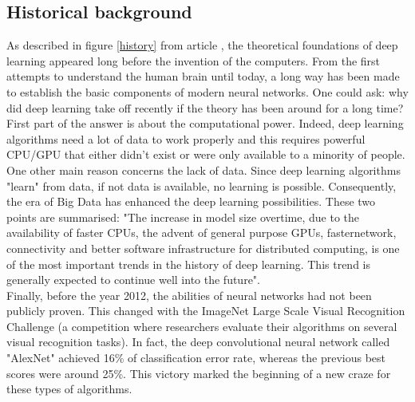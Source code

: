 \subsection{Historical background}
\label{historical_background}
As described in figure \ref{history} from article \cite{14}, the theoretical foundations of deep learning appeared long before the invention of the computers. From the first attempts to understand the human brain until today, a long way has been made to establish the basic components of modern neural networks. One could ask: why did deep learning take off recently if the theory has been around for a long time?\\
First part of the answer is about the computational power. Indeed, deep learning algorithms need a lot of data to work properly and this requires powerful CPU/GPU that either didn't exist or were only available to a minority of people. One other main reason concerns the lack of data. Since deep learning algorithms "learn" from data, if not data is available, no learning is possible. Consequently, the era of Big Data has enhanced the deep learning possibilities. These two points are summarised: "The increase in model size overtime, due to the availability of faster CPUs, the advent of general purpose GPUs, fasternetwork, connectivity and better software infrastructure for distributed computing, is one of the most important trends in the history of deep learning. This trend is generally expected to continue well into the future"\cite{15}.\\
Finally, before the year 2012, the abilities of neural networks had not been publicly proven. This changed with the ImageNet Large Scale Visual Recognition Challenge (a competition where researchers evaluate their algorithms on several visual recognition tasks). In fact, the deep convolutional neural network called "AlexNet" achieved 16\% of classification error rate, whereas the previous best scores were around 25\%. This victory marked the beginning of a new craze for these types of algorithms.




